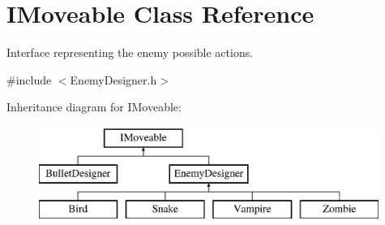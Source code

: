 \hypertarget{class_i_moveable}{}\section{I\+Moveable Class Reference}
\label{class_i_moveable}


Interface representing the enemy possible actions.  




{\ttfamily \#include $<$Enemy\+Designer.\+h$>$}

Inheritance diagram for I\+Moveable\+:\begin{figure}[H]
\begin{center}
\leavevmode
\includegraphics[height=3.000000cm]{class_i_moveable}
\end{center}
\end{figure}
